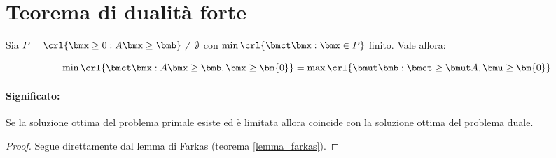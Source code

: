 \documentclass[\main/main.tex]{subfiles}
\begin{document}
\section{Teorema di dualità forte}

\begin{theorem}
  \label{dualita_forte}
  Sia $P=\crl{\bmx\geq0: A\bmx\geq\bmb} \neq \emptyset$ con $\min\crl{\bmct\bmx: \bmx \in P}$ finito. Vale allora:

  \[
    \min\crl{\bmct\bmx: A\bmx \geq \bmb, \bmx \geq \bm{0}} = \max\crl{\bmut\bmb: \bmct \geq \bmut A, \bmu \geq \bm{0}}
  \]
  \paragraph*{Significato:} Se la soluzione ottima del problema primale esiste ed è limitata allora coincide con la soluzione ottima del problema duale.
\end{theorem}

\begin{proof}
  Segue direttamente dal lemma di Farkas (teorema \ref{lemma_farkas}).
\end{proof}
\end{document}
